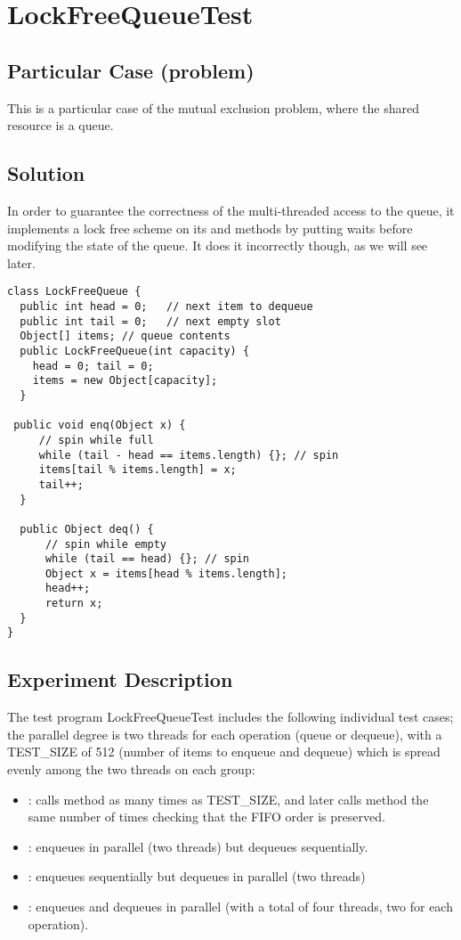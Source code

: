 \newpage
\section{\textbf{LockFreeQueueTest}}

\subsection{Particular Case (problem)}
This is a particular case of the mutual exclusion problem, where the
shared resource is a queue.

\subsection{Solution}
In order to guarantee the correctness of
the multi-threaded access to the queue, it implements a lock free
scheme on its  and  methods by putting waits
before modifying the state of the queue. It does it incorrectly
though, as we will see later. \\

\begin{lstlisting}[style=numbers]
class LockFreeQueue {
  public int head = 0;   // next item to dequeue
  public int tail = 0;   // next empty slot
  Object[] items; // queue contents
  public LockFreeQueue(int capacity) {
    head = 0; tail = 0;
    items = new Object[capacity];
  }

 public void enq(Object x) {
     // spin while full
     while (tail - head == items.length) {}; // spin
     items[tail % items.length] = x;
     tail++;
  }

  public Object deq() {
      // spin while empty
      while (tail == head) {}; // spin
      Object x = items[head % items.length];
      head++;
      return x;
  }
}
\end{lstlisting}
\hfill

\subsection{Experiment Description}
The test program LockFreeQueueTest includes the following individual
test cases; the parallel degree is two threads for each operation
(queue or dequeue), with a TEST\_SIZE of 512 (number of items to
enqueue and dequeue) which is spread evenly among the two threads on
each group:

\begin{itemize}
  \item {}: calls  method as many times as
    TEST\_SIZE, and later calls  method the same number of
    times checking that the FIFO order is preserved. 
  \item {}: enqueues in parallel (two threads) but dequeues
    sequentially.
  \item {}: enqueues sequentially but dequeues in
    parallel (two threads)
  \item {}: enqueues and dequeues in parallel (with
    a total of four threads, two for each operation).
\end{itemize}

